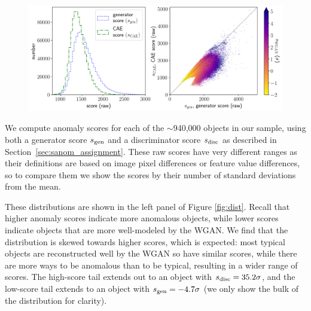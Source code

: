 \begin{figure}
    \centering
    \includegraphics[width=\textwidth]{score_distribution_ae}
    \caption{}
    \label{fig:dist_ae}
\end{figure}

We compute anomaly scores for each of the $\sim$940,000 objects in our sample, using both a generator score $s_\mathrm{gen}$ and a discriminator score $s_\mathrm{disc}$ as described in Section~\ref{sec:sanom_assignment}.
These raw scores have very different ranges as their definitions are based on image pixel differences or feature value differences, so to compare them we show the scores by their number of standard deviations from the mean. 

These distributions are shown in the left panel of Figure \ref{fig:dist}.
Recall that higher anomaly scores indicate more anomalous objects, while lower scores indicate objects that are more well-modeled by the WGAN.
We find that the distribution is skewed towards higher scores, which is expected: most typical objects are reconstructed well by the WGAN so have similar scores, while there are more ways to be anomalous than to be typical, resulting in a wider range of scores.
The high-score tail extends out to an object with $s_\mathrm{disc}=35.2\sigma$, and the low-score tail extends to an object with $s_\mathrm{gen}=-4.7\sigma$ (we only show the bulk of the distribution for clarity).

